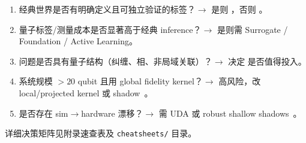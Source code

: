 \begin{enumerate}[leftmargin=*]
  \item 经典世界是否有明确定义且可独立验证的标签？$\rightarrow$ 是则 \pathone{}，否则 \pathtwo{}。
  \item 量子标签/测量成本是否显著高于经典 inference？$\rightarrow$ 是则需 Surrogate / Foundation / Active Learning。
  \item 问题是否具有量子结构（纠缠、相、非局域关联）？$\rightarrow$ 决定 \pathtwo{} 是否值得投入。
  \item 系统规模 $>20$ qubit 且用 global fidelity kernel？$\rightarrow$ 高风险，改 local/projected kernel 或 shadow~\cite{ExponentialConcentrationQK2024,MitigateConcentrationCovariant2025}。
  \item 是否存在 sim$\rightarrow$hardware 漂移？$\rightarrow$ 需 UDA 或 robust shallow shadows~\cite{UDAImperfectQuantumData2026,RobustShallowShadows2025}。
\end{enumerate}

详细决策矩阵见附录速查表及 \texttt{cheatsheets/} 目录。
